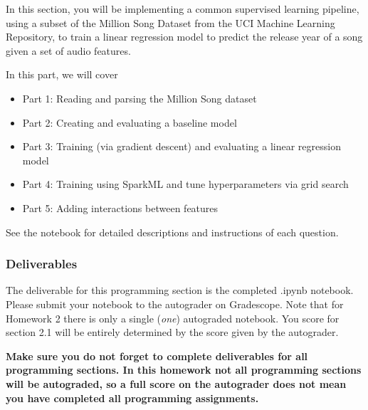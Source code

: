 In this section, you will be implementing a common supervised learning pipeline, using a subset of the Million Song Dataset from the UCI Machine Learning Repository, to train a linear regression model to predict the release year of a song given a set of audio features.

In this part, we will cover
\begin{itemize}
    \item Part 1: Reading and parsing the Million Song dataset
    \item Part 2: Creating and evaluating a baseline model
    \item Part 3: Training (via gradient descent) and evaluating a linear regression model
    \item Part 4: Training using SparkML and tune hyperparameters via grid search
    \item Part 5: Adding interactions between features
\end{itemize}

See the notebook for detailed descriptions and instructions of each question.

\subsubsection{Deliverables}
The deliverable for this programming section is the completed .ipynb notebook. Please submit your notebook to the autograder on Gradescope. Note that for Homework 2 there is only a single (\textit{one}) autograded notebook. You score for section 2.1 will be entirely determined by the score given by the autograder.

\textbf{Make sure you do not forget to complete deliverables for all programming sections. In this homework not all programming sections will be autograded, so a full score on the autograder does not mean you have completed all programming assignments.}


\clearpage

